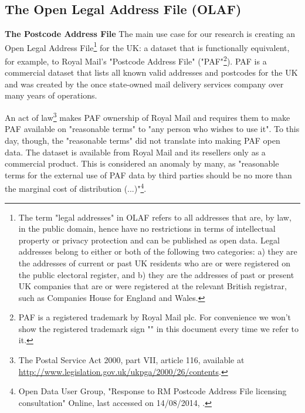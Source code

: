 \subsection{The Open Legal Address File (OLAF)}
\label{subs:the-problem-of-creating-an-olaf}

\textbf{The Postcode Address File} The main use case for our research is creating an Open Legal Address File\footnote{The term "legal addresses" in OLAF refers to all addresses that are, by law, in the public domain, hence have no restrictions in terms of intellectual property or privacy protection and can be published as open data. Legal addresses belong to either or both of the following two categories: a) they are the addresses of current or past UK residents who are or were registered on the public electoral register, and b) they are the addresses of past or present UK companies that are or were registered at the relevant British registrar, such as Companies House for England and Wales.} for the UK: a dataset that is functionally equivalent, for example, to Royal Mail's "Postcode Address File" ("PAF"\footnote{PAF is a registered trademark by Royal Mail plc. For convenience we won't show the registered trademark sign "\textregistered" in this document every time we refer to it.}). PAF is a commercial dataset that lists all known valid addresses and postcodes for the UK and was created by the once state-owned mail delivery services company over many years of operations.

An act of law\footnote{The Postal Service Act 2000, part VII, article 116, available at \url{http://www.legislation.gov.uk/ukpga/2000/26/contents}.} makes PAF ownership of Royal Mail and requires them to make PAF available on "reasonable terms" to "any person who wishes to use it". To this day, though, the "reasonable terms" did not translate into making PAF open data. The dataset is available from Royal Mail and its resellers only as a commercial product. This is considered an anomaly by many, as "reasonable terms for the external use of PAF data by third parties should be no more than the marginal cost of distribution (...)"\footnote{Open Data User Group, "Response to RM Postcode Address File licensing consultation" Online, last accessed on 14/08/2014, \odugurl.}.

